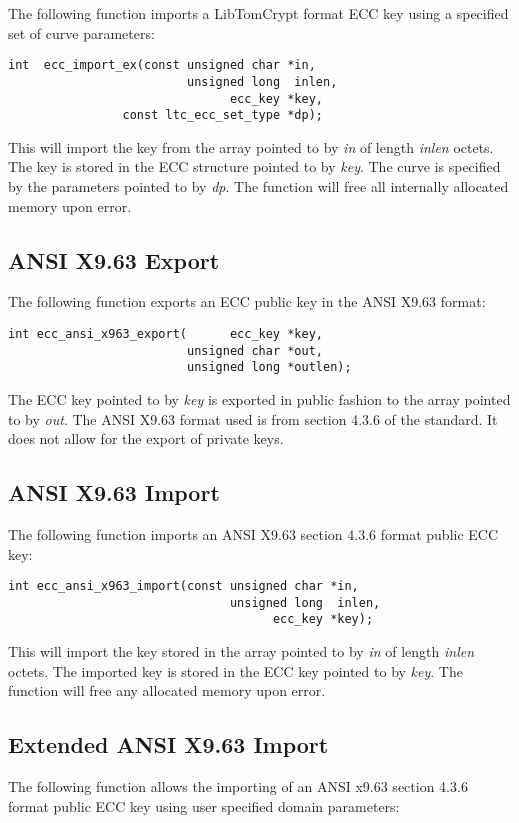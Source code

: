 \documentclass[synpaper]{book}
\begin{document}
The following function imports a LibTomCrypt format ECC key using a specified set of curve parameters:
\begin{verbatim}
int  ecc_import_ex(const unsigned char *in, 
                         unsigned long  inlen, 
                               ecc_key *key, 
                const ltc_ecc_set_type *dp);
\end{verbatim}
This will import the key from the array pointed to by \textit{in} of length \textit{inlen} octets.  The key is stored in
the ECC structure pointed to by \textit{key}.  The curve is specified by the parameters pointed to by \textit{dp}.  The function will free
all internally allocated memory upon error.

\subsection{ANSI X9.63 Export}
The following function exports an ECC public key in the ANSI X9.63 format:

\begin{verbatim}
int ecc_ansi_x963_export(      ecc_key *key, 
                         unsigned char *out, 
                         unsigned long *outlen);
\end{verbatim}
The ECC key pointed to by \textit{key} is exported in public fashion to the array pointed to by \textit{out}.  The ANSI X9.63 format used is from
section 4.3.6 of the standard.  It does not allow for the export of private keys.

\subsection{ANSI X9.63 Import}
The following function imports an ANSI X9.63 section 4.3.6 format public ECC key:

\begin{verbatim}
int ecc_ansi_x963_import(const unsigned char *in, 
                               unsigned long  inlen, 
                                     ecc_key *key);
\end{verbatim}
This will import the key stored in the array pointed to by \textit{in} of length \textit{inlen} octets.  The imported key is stored in the ECC key pointed to by 
\textit{key}.  The function will free any allocated memory upon error.

\subsection{Extended ANSI X9.63 Import}
The following function allows the importing of an ANSI x9.63 section 4.3.6 format public ECC key using user specified domain parameters:
\end{document}
